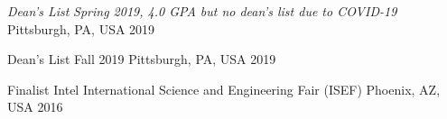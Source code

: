 






\begin{cvhonors}

\cvhonor
{\emph{Dean's List}} %
{\emph{Spring 2019, 4.0 GPA but no dean's list due to COVID-19} } %
{Pittsburgh, PA, USA} %
{2019} %

\cvhonor
{Dean's List} %
{Fall 2019} %
{Pittsburgh, PA, USA} %
{2019} %

\end{cvhonors}




\begin{cvhonors}

\cvhonor
{Finalist} %
{Intel International Science and Engineering Fair (ISEF)} %
{Phoenix, AZ, USA} %
{2016} %


\end{cvhonors}



